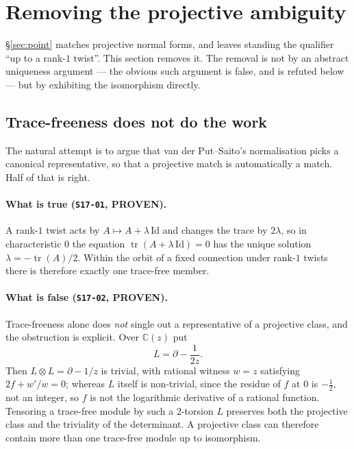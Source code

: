 \section{Removing the projective ambiguity}\label{sec:projective}

\S\ref{sec:point} matches projective normal forms, and leaves standing the
qualifier ``up to a rank-$1$ twist''. This section removes it. The removal is
not by an abstract uniqueness argument --- the obvious such argument is false,
and is refuted below --- but by exhibiting the isomorphism directly.

\subsection{Trace-freeness does not do the work}\label{ssec:tracefree}

The natural attempt is to argue that van der Put--Saito's normalisation picks a
canonical representative, so that a projective match is automatically a match.
Half of that is right.

\paragraph{What is true (\texttt{S17-01}, \textbf{PROVEN}).}
A rank-$1$ twist acts by $A\mapsto A+\lambda\,\mathrm{Id}$ and changes the
trace by $2\lambda$, so in characteristic $0$ the equation
$\operatorname{tr}(A+\lambda\,\mathrm{Id})=0$ has the unique solution
$\lambda=-\operatorname{tr}(A)/2$. Within the orbit of a fixed connection under
rank-$1$ twists there is therefore exactly one trace-free member.

\paragraph{What is false (\texttt{S17-02}, \textbf{PROVEN}).}
Trace-freeness alone does \emph{not} single out a representative of a
projective class, and the obstruction is explicit. Over $\mathbb C(z)$ put
\[
  L=\partial-\frac{1}{2z}.
\]
Then $L\otimes L=\partial-1/z$ is trivial, with rational witness $w=z$
satisfying $2f+w'/w=0$; whereas $L$ itself is non-trivial, since the residue of
$f$ at $0$ is $-\tfrac12$, not an integer, so $f$ is not the logarithmic
derivative of a rational function. Tensoring a trace-free module by such a
$2$-torsion $L$ preserves both the projective class and the triviality of the
determinant. A projective class can therefore contain more than one trace-free
module up to isomorphism.

